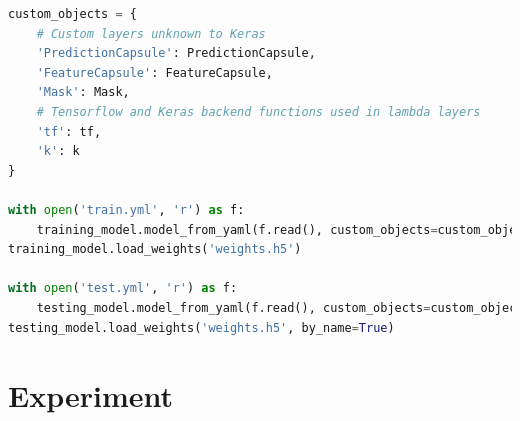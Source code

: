 \begin{lstlisting}[language=Python, caption=Loading a model in \textit{Keras}]
custom_objects = {
    # Custom layers unknown to Keras
    'PredictionCapsule': PredictionCapsule,
    'FeatureCapsule': FeatureCapsule,
    'Mask': Mask,
    # Tensorflow and Keras backend functions used in lambda layers
    'tf': tf,
    'k': k
}

with open('train.yml', 'r') as f:
    training_model.model_from_yaml(f.read(), custom_objects=custom_objects)
training_model.load_weights('weights.h5')

with open('test.yml', 'r') as f:
    testing_model.model_from_yaml(f.read(), custom_objects=custom_objects)
testing_model.load_weights('weights.h5', by_name=True)
\end{lstlisting}

\section{Experiment}

